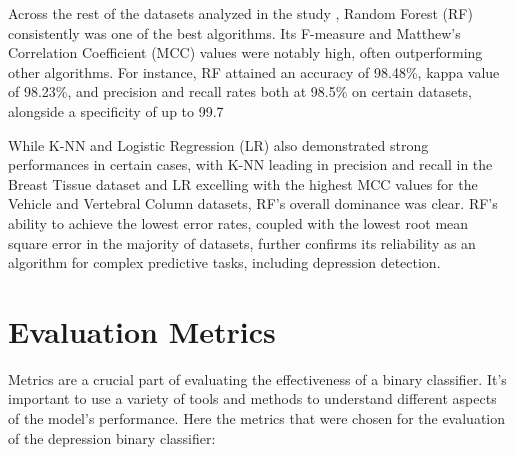 Across the rest of the datasets analyzed in the study \cite{siraj2023performanceModelComparison}, Random Forest (RF) consistently was one of the best algorithms. Its F-measure and Matthew's Correlation Coefficient (MCC) values were notably high, often outperforming other algorithms. For instance, RF attained an accuracy of 98.48\%, kappa value of 98.23\%, and precision and recall rates both at 98.5\% on certain datasets, alongside a specificity of up to 99.7%

While K-NN and Logistic Regression (LR) also demonstrated strong performances in certain cases, with K-NN leading in precision and recall in the Breast Tissue dataset and LR excelling with the highest MCC values for the Vehicle and Vertebral Column datasets, RF's overall dominance was clear. RF's ability to achieve the lowest error rates, coupled with the lowest root mean square error in the majority of datasets, further confirms its reliability as an algorithm for complex predictive tasks, including depression detection.

\section{Evaluation Metrics}
\quad Metrics are a crucial part of evaluating the effectiveness of a binary classifier. It's important to use a variety of tools and methods to understand different aspects of the model's performance. Here the metrics that were chosen for the evaluation of the depression binary classifier:

